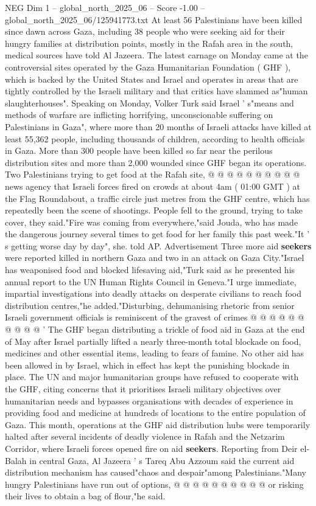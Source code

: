 \begin{textsample}{NEG Dim 1 – global\_north\_2025\_06 – Score -1.00 – global\_north\_2025\_06/125941773.txt}  \label{ex:f1_neg_117}
At least 56 Palestinians have been killed since dawn across Gaza, including 38 people who were seeking aid for their hungry families at distribution points, mostly in the Rafah area in the south, medical sources have told Al Jazeera.
The latest carnage on Monday came at the controversial sites operated by the Gaza Humanitarian Foundation ( GHF ), which is backed by the United States and Israel and operates in areas that are tightly controlled by the Israeli military and that critics have slammed as"human slaughterhouses".
Speaking on Monday, Volker Turk said Israel ' s"means and methods of warfare are inflicting horrifying, unconscionable suffering on Palestinians in Gaza", where more than 20 months of Israeli attacks have killed at least 55,362 people, including thousands of children, according to health officials in Gaza.
More than 300 people have been killed so far near the perilous distribution sites and more than 2,000 wounded since GHF began its operations.
Two Palestinians trying to get food at the Rafah site, @ @ @ @ @ @ @ @ @ @ news agency that Israeli forces fired on crowds at about 4am ( 01:00 GMT ) at the Flag Roundabout, a traffic circle just metres from the GHF centre, which has repeatedly been the scene of shootings.
People fell to the ground, trying to take cover, they said."Fire was coming from everywhere,"said Jouda, who has made the dangerous journey several times to get food for her family this past week."It ' s getting worse day by day", she. told AP.
Advertisement Three more aid \textbf{seekers} were reported killed in northern Gaza and two in an attack on Gaza City."Israel has weaponised food and blocked lifesaving aid,"Turk said as he presented his annual report to the UN Human Rights Council in Geneva."I urge immediate, impartial investigations into deadly attacks on desperate civilians to reach food distribution centres,"he added."Disturbing, dehumanising rhetoric from senior Israeli government officials is reminiscent of the gravest of crimes @ @ @ @ @ @ @ @ @ @ ' The GHF began distributing a trickle of food aid in Gaza at the end of May after Israel partially lifted a nearly three-month total blockade on food, medicines and other essential items, leading to fears of famine.
No other aid has been allowed in by Israel, which in effect has kept the punishing blockade in place.
The UN and major humanitarian groups have refused to cooperate with the GHF, citing concerns that it prioritises Israeli military objectives over humanitarian needs and bypasses organisations with decades of experience in providing food and medicine at hundreds of locations to the entire population of Gaza.
This month, operations at the GHF aid distribution hubs were temporarily halted after several incidents of deadly violence in Rafah and the Netzarim Corridor, where Israeli forces opened fire on aid \textbf{seekers}.
Reporting from Deir el-Balah in central Gaza, Al Jazeera ' s Tareq Abu Azzoum said the current aid distribution mechanism has caused"chaos and despair"among Palestinians."Many hungry Palestinians have run out of options, @ @ @ @ @ @ @ @ @ @ or risking their lives to obtain a bag of flour,"he said.

\end{textsample}
